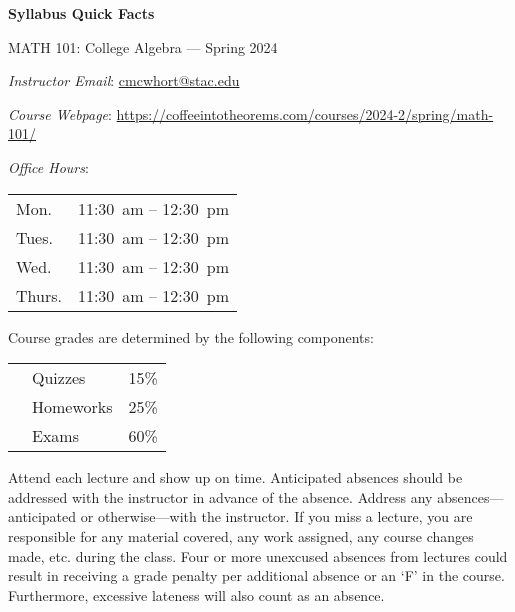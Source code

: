 \documentclass[11pt,letterpaper]{article}
\begin{document}
\begin{center} 
\bfseries
\color{stacred}
\LARGE Syllabus Quick Facts \par\vspace{0.2\baselineskip}
\Large MATH 101: College Algebra --- Spring 2024
\end{center} \pspace


\hspace{0.53cm} {\itshape Instructor Email}: \href{mailto:cmcwhort@stac.edu}{cmcwhort@stac.edu} \par
\hspace{0.53cm} {\itshape Course Webpage}: \href{https://coffeeintotheorems.com/courses/2024-2/spring/math-101/}{https://coffeeintotheorems.com/courses/2024-2/spring/math-101/} \par
\hspace{0.53cm} {\itshape Office Hours}: 	\par \vspace{-0.3cm}
	\begin{table}[!ht]
	\centering
	\begin{tabular}{l || l}
	Mon. & 11:30~am -- 12:30~pm \\
	Tues. & 11:30~am -- 12:30~pm \\
	Wed. & 11:30~am -- 12:30~pm \\
	Thurs. & 11:30~am -- 12:30~pm 
	\end{tabular}
	\end{table}


Course grades are determined by the following components: \par \vspace{-0.3cm}
	\begin{table}[!ht]
        \begin{tabular}{clr}
	& Quizzes & 15\% \\
	& Homeworks & 25\% \\
	& Exams & 60\% 
        \end{tabular} 
        \end{table}


Attend each lecture and show up on time. Anticipated absences should be addressed with the instructor in advance of the absence. Address any absences---anticipated or otherwise---with the instructor. If you miss a lecture, you are responsible for any material covered, any work assigned, any course changes made, etc. during the class. Four or more unexcused absences from lectures could result in receiving a grade penalty per additional absence or an `F' in the course. Furthermore, excessive lateness will also count as an absence. \pspace
\end{document}

